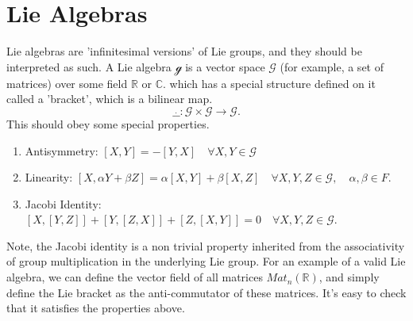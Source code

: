 \section{Lie Algebras}

Lie algebras are 'infinitesimal versions' of Lie groups, and they should be interpreted as such. A Lie algebra $\mathcal{g}$ is a vector space $\mathcal{G}$ (for example, a set of matrices) over some field $\mathbb{ R} $ or $\mathbb{ C }$. which has a special structure defined on it called a 'bracket', which is a bilinear map. 
\[
	\_ \dot \_ : \mathcal{G} \times \mathcal{G} \rightarrow \mathcal{G}. 
\]
This should obey some special properties. 
\begin{enumerate}
	\item Antisymmetry: $[X, Y] = - [Y, X] \quad \forall X, Y \in \mathcal{G}$
	\item Linearity: $[X, \alpha Y + \beta Z] = \alpha [X, Y] + \beta [X, Z] \quad \forall X, Y, Z \in \mathcal{G }, \quad \alpha, \beta \in F$. 
	\item Jacobi Identity: $[X, [Y, Z]] + [Y, [Z, X]] + [Z, [X, Y]] = 0  \quad \forall X, Y, Z \in \mathcal{G}$. 
\end{enumerate}
Note, the Jacobi identity is a non trivial property inherited from the associativity of group multiplication in the underlying Lie group. 
For an example of a valid Lie algebra, we can define the vector field of all matrices $Mat_n(\mathbb{R})$, and simply define the Lie bracket as the anti-commutator of these matrices. It's easy to check that it satisfies the properties above. 

